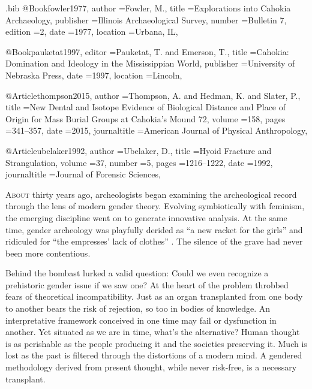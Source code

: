 \begin{filecontents}{\IJSRAidentifier.bib}
@Book{fowler1977,
	author       ={Fowler, M.},
	title        ={Explorations into Cahokia Archaeology},
	publisher    ={Illinois Archaeological Survey},
	number       ={Bulletin 7},
	edition      ={2},
	date         ={1977},
	location     ={Urbana, IL},
}

@Book{pauketat1997,
	editor       ={Pauketat, T. and Emerson, T.},
	title        ={Cahokia: Domination and Ideology in the Mississippian World},
	publisher    ={University of Nebraska Press},
	date         ={1997},
	location     ={Lincoln},
}

@Article{thompson2015,
	author       ={Thompson, A. and Hedman, K. and Slater, P.},
	title        ={New Dental and Isotope Evidence of Biological Distance and Place of Origin for Mass Burial Groups at Cahokia’s Mound 72},
	volume       ={158},
	pages        ={341--357},
	date         ={2015},
	journaltitle ={American Journal of Physical Anthropology},
}

@Article{ubelaker1992,
	author       ={Ubelaker, D.},
	title        ={Hyoid Fracture and Strangulation},
	volume       ={37},
	number       ={5},
	pages        ={1216--1222},
	date         ={1992},
	journaltitle ={Journal of Forensic Sciences},
}

\end{filecontents}
\IJSRAopening%
\lettrine{A}{bout} thirty years ago, archeologists began examining the archeological record through the lens of modern gender theory. Evolving symbiotically with feminism, the emerging discipline went on to generate innovative analysis. At the same time, gender archeology was playfully derided as \enquote{a new racket for the girls} and ridiculed for \enquote{the empresses' lack of clothes} \parencite[321]{bahn1992}. The silence of the grave had never been more contentious. 

Behind the bombast lurked a valid question: Could we even recognize a prehistoric gender issue if we saw one? At the heart of the problem throbbed fears of theoretical incompatibility. Just as an organ transplanted from one body to another bears the risk of rejection, so too in bodies of knowledge. An interpretative framework conceived in one time may fail or dysfunction in another. Yet situated as we are in time, what's the alternative? Human thought is as perishable as the people producing it and the societies preserving it. Much is lost as the past is filtered through the distortions of a modern mind. A gendered methodology derived from present thought, while never risk-free, is a necessary transplant. 

